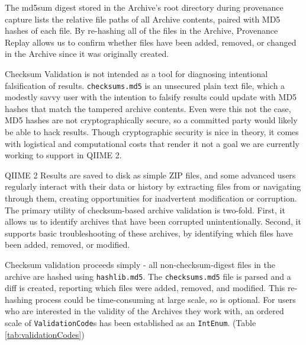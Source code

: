 The md5sum digest stored in the Archive’s root directory during provenance
capture lists the relative file paths of all Archive contents, paired with MD5
hashes of each file.  By re-hashing all of the files in the Archive, Provenance
Replay allows us to confirm whether files have been added, removed, or changed
in the Archive since it was originally created. 

Checksum Validation is not intended as a tool for diagnosing intentional
falsification of results. \texttt{checksums.md5} is an unsecured plain text file, which a
modestly savvy user with the intention to falsify results could update with MD5
hashes that match the tampered archive contents. Even were this not the case,
MD5 hashes are not cryptographically secure, so a committed party would likely
be able to hack results. Though cryptographic security is nice in theory, it
comes with logistical and computational costs that render it not a goal we are
currently working to support in QIIME 2.

QIIME 2 Results are saved to disk as simple ZIP files, and some advanced users
regularly interact with their data or history by extracting files from or
navigating through them, creating opportunities for inadvertent modification or
corruption. The primary utility of checksum-based archive validation is
two-fold. First, it allows us to identify archives that have been corrupted
unintentionally. Second, it supports basic troubleshooting of these archives, by
identifying which files have been added, removed, or modified. 

Checksum validation proceeds simply - all non-checksum-digest files in the
archive are hashed using \texttt{hashlib.md5}. The \texttt{checksums.md5} file is parsed and a
diff is created, reporting which files were added, removed, and modified. This
re-hashing process could be time-consuming at large scale, so is optional. For
users who are interested in the validity of the Archives they work with, an
ordered scale of \texttt{ValidationCode}s has been established as an \texttt{IntEnum}. (Table \ref{tab:validationCodes})

